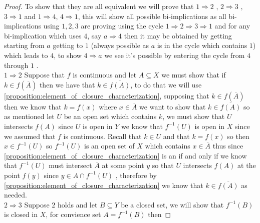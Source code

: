 \begin{proof}
    To show that they are all equivalent we will prove that \( 1 \Rightarrow 2
    \) , \( 2 \Rightarrow 3 \) , \( 3 \Rightarrow 1 \) and \( 1 \Rightarrow 4
    \), \( 4 \Rightarrow 1 \), this will show all possible bi-implications as
    all bi-implications using \( 1, 2, 3 \) are proving using the cycle \( 1
    \Rightarrow 2 \Rightarrow 3 \Rightarrow 1 \) and for any bi-implication
    which uses \( 4 \), say \( a \Rightarrow 4 \) then it may be obtained by
    getting starting from \( a \) getting to \( 1 \) (always possible as \( a \)
    is in the cycle which contains \( 1 \)) which leads to \( 4 \), to show \( 4
    \Rightarrow a\) we see it's possible by entering the cycle from \( 4 \)
    through \( 1 \) .\\
    \( 1 \Rightarrow 2 \) Suppose that \( f \) is continuous and let \( A
    \subseteq X \) we must show that if \( k \in  f\left( \overline{A}  \right)
    \) then we have that \( k \in  \overline{f\left( A \right) }  \), to do that
    we will use
    \ref{proposition:element_of_closure_characterization}, supposing that \( k
    \in  f\left( \overline{A}  \right)  \) then we know that \( k = f\left( x
    \right)  \) where \( x \in  \overline{A}  \) we want to show that \( k \in
    \overline{f\left( A \right) } \) so as mentioned let \( U \) be an open set
    which contains \( k \), we must show that \( U \) intersects \( f\left( A
    \right)  \) since \( U \) is open in \( Y \) we know that \( f ^{-1} \left(
    U\right)  \) is open in \( X \) since we assumed that \( f \) is continuous.
    Recall that \( k \in  U \) and that \( k =  f\left( x \right)  \) so then \(
     x \in f ^{-1} \left( U \right) \) so \( f ^{-1} \left( U \right)  \) is an
     open set of \( X \) which contains \( x \in \overline{A}  \) thus since
     \ref{proposition:element_of_closure_characterization} is an if and only if
     we know that \( f ^{-1} \left( U \right)  \) must intersect \( \overline{A}
     \) at some point \( y \) so that \( U  \) intersects \( f\left( A \right)
     \) at the point \( f\left( y \right)  \) since \( y \in  A \cap f ^{-1}
     \left( U \right)  \) , therefore by
     \ref{proposition:element_of_closure_characterization} we know that \( k \in
     \overline{f\left( A \right) } \) as needed.\\
     \( 2 \Rightarrow 3 \) Suppose \( 2  \) holds and let \( B \subseteq Y \) be
     a closed set, we will show that \( f ^{-1} \left( B \right)  \) is closed
     in \( X \), for convience set \( A =  f ^{-1}  \left( B \right)  \) then

\end{proof}
